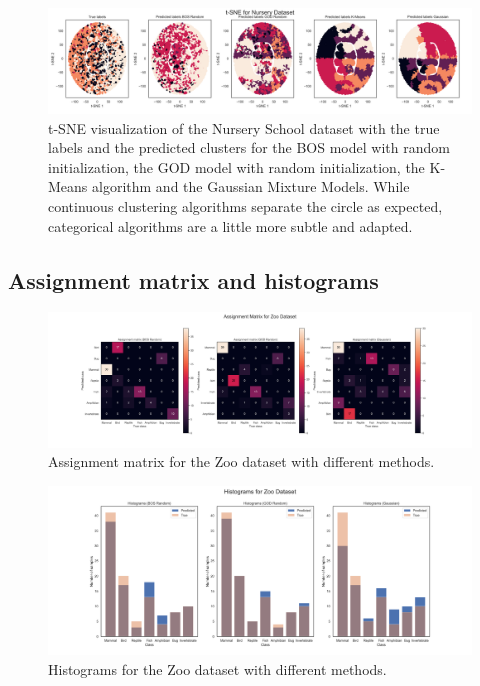 \begin{figure}[H]
    \centering
    \includegraphics[width=\textwidth]{python_figures/tsne_nursery.png}
    \caption{t-SNE visualization of the Nursery School dataset with the true labels and the predicted clusters for the BOS model with random initialization, the GOD model with random initialization, the K-Means algorithm and the Gaussian Mixture Models. While continuous clustering algorithms separate the circle as expected, categorical algorithms are a little more subtle and adapted.}
    \label{fig:tsne_hr}
\end{figure}


\subsection*{Assignment matrix and histograms}
\label{sec:appendix_assign}

\begin{figure}[H]
    \centering
    \includegraphics[width=\linewidth]{python_figures/assignment_matrix_zoo.png}
    \caption{Assignment matrix for the Zoo dataset with different methods.}
    \label{fig:assign_zoo}
\end{figure}

\begin{figure}[H]
    \centering
    \includegraphics[width=\linewidth]{python_figures/histograms_zoo.png}
    \caption{Histograms for the Zoo dataset with different methods.}
    \label{fig:hist_zoo}
\end{figure}
